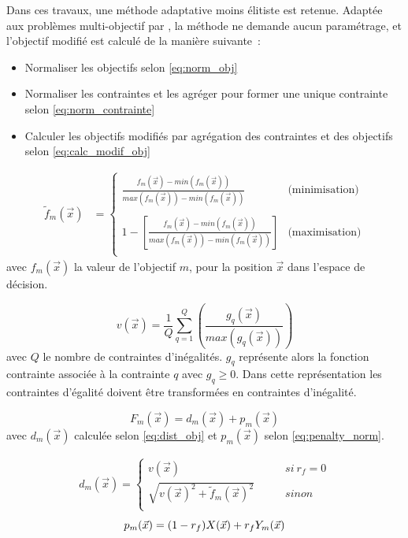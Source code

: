 Dans ces travaux, une méthode adaptative moins élitiste est retenue. Adaptée
aux problèmes multi-objectif par \textcite{Woldesenbet20073077}, la méthode ne demande
aucun paramétrage, et l’objectif modifié est calculé de la manière suivante~:
\begin{itemize}
  \item Normaliser les objectifs selon \eqref{eq:norm_obj}
  \item Normaliser les contraintes et les agréger pour former une unique contrainte selon \eqref{eq:norm_contrainte}
  \item Calculer les objectifs modifiés par agrégation des contraintes et des objectifs selon \eqref{eq:calc_modif_obj}
\end{itemize}

\begin{align}\label{eq:norm_obj}
  \tilde{f}_{m}(\vec{x}) &= \begin{cases}
    \frac{f_{m}(\vec{x}) - min(f_{m}(\vec{x}))}{max(f_{m}(\vec{x})) - min(f_{m}(\vec{x}))}
    & \text{(minimisation)} \\ \\ 1 - \left[\frac{f_{m}(\vec{x}) -
    min(f_{m}(\vec{x}))}{max(f_{m}(\vec{x})) - min(f_{m}(\vec{x}))}\right] &
    \text{(maximisation)} \\
  \end{cases}
\end{align}
avec $f_{m}(\vec{x})$ la valeur de l’objectif $m$, pour la position $\vec{x}$ dans l’espace de décision.

\begin{equation}\label{eq:norm_contrainte}
  v(\vec{x}) = \frac{1}{Q} \sum_{q=1}^{Q} \left(\frac{g_{q}(\vec{x})}{max(g_{q}(\vec{x}))}\right)
\end{equation}
avec $Q$ le nombre de contraintes d’inégalités. $g_{q}$ représente alors la fonction contrainte
associée à la contrainte $q$ avec $g_{q} \geq 0$. Dans cette représentation les contraintes
d’égalité doivent être transformées en contraintes d’inégalité.

\begin{equation}\label{eq:calc_modif_obj}
  F_{m}(\vec{x}) = d_{m}(\vec{x}) + p_{m}(\vec{x})
\end{equation}
avec $d_{m}(\vec{x})$ calculée selon \eqref{eq:dist_obj} et $ p_{m}(\vec{x})$ selon \eqref{eq:penalty_norm}.


\begin{align}\label{eq:dist_obj}
  d_{m}(\vec{x}) = \begin{cases}
                          v(\vec{x})                                     & \qquad si\  r_{f} = 0 \\
                          \sqrt{v(\vec{x})^2 + \tilde{f}_{m}(\vec{x})^2} & \qquad sinon          \\
                    \end{cases}
\end{align}
\begin{equation}\label{eq:penalty_norm}
  p_{m}(\vec{x}) = (1 - r_{f})  X(\vec{x}) + r_{f} Y_{m}(\vec{x}) \\
\end{equation}

